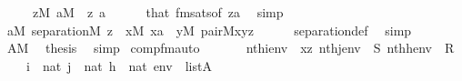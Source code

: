 \begin{isabellebody}
\ \ \ \ \ {\isachardoublequoteopen}z{\isasymin}M{\isachardoublequoteclose}\ {\isachardoublequoteopen}a{\isasymin}M{\isachardoublequoteclose}\ \ z\ a\isanewline
\ \ \ \ \isamarkupfalse%
\ that\ fmsats{\isacharbrackleft}{\kern0pt}of\ {\isachardoublequoteopen}{\isacharbrackleft}{\kern0pt}z{\isacharcomma}{\kern0pt}a{\isacharbrackright}{\kern0pt}{\isachardoublequoteclose}{\isacharbrackright}{\kern0pt}\ \isamarkupfalse%
\ simp\isanewline
\ \ \isamarkupfalse%
\isanewline
\ \ \isamarkupfalse%
\ {\isachardoublequoteopen}{\isasymforall}a{\isasymin}M{\isachardot}{\kern0pt}\ separation{\isacharparenleft}{\kern0pt}{\isacharhash}{\kern0pt}{\isacharhash}{\kern0pt}M{\isacharcomma}{\kern0pt}\ {\isasymlambda}z\ {\isachardot}{\kern0pt}\ {\isasymexists}x{\isasymin}M{\isachardot}{\kern0pt}\ x{\isasymin}a\ {\isacharampersand}{\kern0pt}\ {\isacharparenleft}{\kern0pt}{\isasymexists}y{\isasymin}M{\isachardot}{\kern0pt}\ pair{\isacharparenleft}{\kern0pt}{\isacharhash}{\kern0pt}{\isacharhash}{\kern0pt}M{\isacharcomma}{\kern0pt}x{\isacharcomma}{\kern0pt}y{\isacharcomma}{\kern0pt}z{\isacharparenright}{\kern0pt}{\isacharparenright}{\kern0pt}{\isacharparenright}{\kern0pt}{\isachardoublequoteclose}\isanewline
\ \ \ \ \isamarkupfalse%
\ separation{\isacharunderscore}{\kern0pt}def\ \isamarkupfalse%
\ simp\isanewline
\ \ \isamarkupfalse%
\ {\isacartoucheopen}A{\isasymin}M{\isacartoucheclose}\ \isamarkupfalse%
\ {\isacharquery}{\kern0pt}thesis\ \isamarkupfalse%
\ simp\isanewline
{}\isamarkupfalse%
%
\endisatagproof
{\isafoldproof}%
%
\isadelimproof
\isanewline
%
\endisadelimproof
\isanewline
{}\isamarkupfalse%
\ comp{\isacharunderscore}{\kern0pt}fm{\isacharunderscore}{\kern0pt}auto{\isacharcolon}{\kern0pt}\isanewline
\ \ \isanewline
\ \ \ \ {\isachardoublequoteopen}nth{\isacharparenleft}{\kern0pt}i{\isacharcomma}{\kern0pt}env{\isacharparenright}{\kern0pt}\ {\isacharequal}{\kern0pt}\ xz{\isachardoublequoteclose}\ {\isachardoublequoteopen}nth{\isacharparenleft}{\kern0pt}j{\isacharcomma}{\kern0pt}env{\isacharparenright}{\kern0pt}\ {\isacharequal}{\kern0pt}\ S{\isachardoublequoteclose}\ {\isachardoublequoteopen}nth{\isacharparenleft}{\kern0pt}h{\isacharcomma}{\kern0pt}env{\isacharparenright}{\kern0pt}\ {\isacharequal}{\kern0pt}\ R{\isachardoublequoteclose}\isanewline
\ \ \ \ {\isachardoublequoteopen}i\ {\isasymin}\ nat{\isachardoublequoteclose}\ {\isachardoublequoteopen}j\ {\isasymin}\ nat{\isachardoublequoteclose}\ {\isachardoublequoteopen}h\ {\isasymin}\ nat{\isachardoublequoteclose}\ {\isachardoublequoteopen}env\ {\isasymin}\ list{\isacharparenleft}{\kern0pt}A{\isacharparenright}{\kern0pt}{\isachardoublequoteclose}\isanewline

\end{isabellebody}
